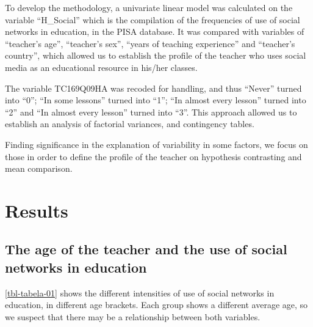 \documentclass{textolivre}
\begin{document}
To develop the methodology, a univariate linear model was calculated on the variable “H\_Social” which is the compilation of the frequencies of use of social networks in education, in the PISA database. It was compared with variables of “teacher's age”, “teacher's sex”, “years of teaching experience” and “teacher's country”, which allowed us to establish the profile of the teacher who uses social media as an educational resource in his/her classes.

The variable TC169Q09HA was recoded for handling, and thus “Never” turned into “0”; “In some lessons” turned into “1”; “In almost every lesson” turned into “2” and “In almost every lesson” turned into “3”.  This approach allowed us to establish an analysis of factorial variances, and contingency tables. 

Finding significance in the explanation of variability in some factors, we focus on those in order to define the profile of the teacher on hypothesis contrasting and mean comparison.

\section{Results}\label{sec-resultados}

\subsection{The age of the teacher and the use of social networks in education}\label{sec-age}

\cref{tbl-tabela-01} shows the different intensities of use of social networks in education, in different age brackets. Each group shows a different average age, so we suspect that there may be a relationship between both variables.
\end{document}
